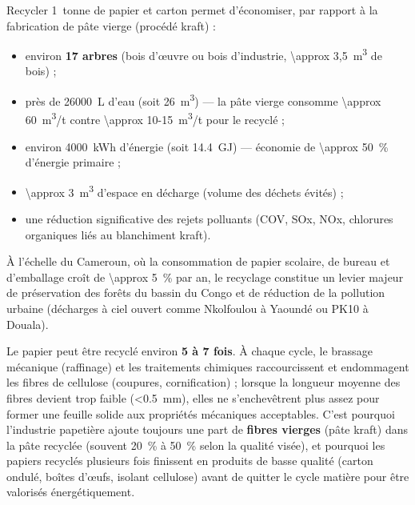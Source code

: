 \documentclass[11pt]{article}
\begin{document}
\begin{exemplebox}
Recycler \SI{1}{tonne} de papier et carton permet d'économiser, par rapport à la fabrication de pâte vierge (procédé kraft) :
\begin{itemize}
\item environ \textbf{17 arbres} (bois d'œuvre ou bois d'industrie, \SI{\approx 3,5}{m^3} de bois) ;
\item près de \SI{26000}{L} d'eau (soit \SI{26}{m^3}) — la pâte vierge consomme \SI{\approx 60}{m^3/t} contre \SI{\approx 10-15}{m^3/t} pour le recyclé ;
\item environ \SI{4000}{kWh} d'énergie (soit \SI{14,4}{GJ}) — économie de \SI{\approx 50}{\%} d'énergie primaire ;
\item \SI{\approx 3}{m^3} d'espace en décharge (volume des déchets évités) ;
\item une réduction significative des rejets polluants (COV, SOx, NOx, chlorures organiques liés au blanchiment kraft).
\end{itemize}
À l'échelle du Cameroun, où la consommation de papier scolaire, de bureau et d'emballage croît de \SI{\approx 5}{\%} par an, le recyclage constitue un levier majeur de préservation des forêts du bassin du Congo et de réduction de la pollution urbaine (décharges à ciel ouvert comme Nkolfoulou à Yaoundé ou PK10 à Douala).
\end{exemplebox}

\begin{savaistu}
Le papier peut être recyclé environ \textbf{5 à 7 fois}. À chaque cycle, le brassage mécanique (raffinage) et les traitements chimiques raccourcissent et endommagent les fibres de cellulose (coupures, cornification) ; lorsque la longueur moyenne des fibres devient trop faible (\textless \SI{0,5}{mm}), elles ne s'enchevêtrent plus assez pour former une feuille solide aux propriétés mécaniques acceptables. C'est pourquoi l'industrie papetière ajoute toujours une part de \textbf{fibres vierges} (pâte kraft) dans la pâte recyclée (souvent \SI{20}{\%} à \SI{50}{\%} selon la qualité visée), et pourquoi les papiers recyclés plusieurs fois finissent en produits de basse qualité (carton ondulé, boîtes d'œufs, isolant cellulose) avant de quitter le cycle matière pour être valorisés énergétiquement.
\end{savaistu}
\end{document}
